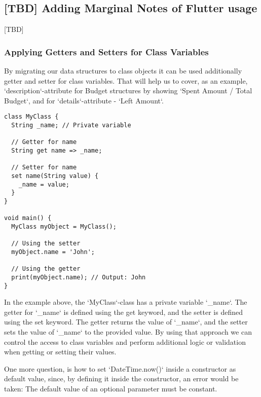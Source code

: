 
\subsection{[TBD] Adding Marginal Notes of Flutter usage}

[TBD]

\subsubsection{Applying Getters and Setters for Class Variables}

By migrating our data structures to class objects it can be used additionally getter and setter for class variables.
That will help us to cover, as an example, `description`-attribute for Budget structures by showing 
`Spent Amount / Total Budget`, and for `details`-attribute - `Left Amount`.

\begin{lstlisting}
class MyClass {
  String _name; // Private variable

  // Getter for name
  String get name => _name;

  // Setter for name
  set name(String value) {
    _name = value;
  }
}

void main() {
  MyClass myObject = MyClass();

  // Using the setter
  myObject.name = 'John';

  // Using the getter
  print(myObject.name); // Output: John
}
\end{lstlisting}

In the example above, the `MyClass`-class has a private variable `\_name`. The getter for `\_name` is defined 
using the get keyword, and the setter is defined using the set keyword. The getter returns the value of 
`\_name`, and the setter sets the value of `\_name` to the provided value. By using that approach we can control 
the access to class variables and perform additional logic or validation when getting or setting their values.

One more question, is how to set `DateTime.now()` inside a constructor as default value, since, by defining it inside
the constructor, an error would be taken: The default value of an optional parameter must be constant.

